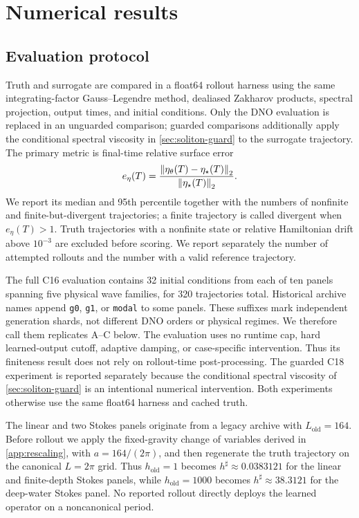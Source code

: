 \section{Numerical results}
\label{sec:results}

\subsection{Evaluation protocol}

Truth and surrogate are compared in a float64 rollout harness using the same
integrating-factor Gauss--Legendre method, dealiased Zakharov products, spectral
projection, output times, and initial conditions. Only the DNO evaluation is
replaced in an unguarded comparison; guarded comparisons additionally apply
the conditional spectral viscosity in \cref{sec:soliton-guard} to the
surrogate trajectory. The primary metric is final-time relative surface error
\begin{equation}
  e_\eta(T)=
  \frac{\left\lVert \eta_\theta(T)-\eta_\star(T)\right\rVert_2}
       {\left\lVert \eta_\star(T)\right\rVert_2}.
  \label{eq:rollout-metric}
\end{equation}
We report its median and 95th percentile together with the numbers of
nonfinite and finite-but-divergent trajectories; a finite trajectory is called
divergent when $e_\eta(T)>1$. Truth trajectories with a nonfinite state or
relative Hamiltonian drift above $10^{-3}$ are excluded before scoring.  We
report separately the number of attempted rollouts and the number with a
valid reference trajectory.

The full C16 evaluation contains 32 initial conditions from each of ten panels
spanning five physical wave families, for 320 trajectories total.  Historical
archive names append \texttt{g0}, \texttt{g1}, or \texttt{modal} to some
panels.  These suffixes mark independent generation shards, not different DNO
orders or physical regimes.  We therefore call them replicates A--C below.  The
evaluation uses no runtime cap, hard
learned-output cutoff, adaptive damping, or case-specific intervention.
Thus its finiteness result does not rely on rollout-time post-processing. The guarded C18
experiment is reported separately because the conditional spectral viscosity
of \cref{sec:soliton-guard} is an intentional numerical intervention. Both
experiments otherwise use the same float64 harness and cached truth.

The linear and two Stokes panels originate from a legacy archive with
$L_{\mathrm{old}}=164$.  Before rollout we apply the fixed-gravity change of
variables derived in \cref{app:rescaling}, with $a=164/(2\pi)$, and then
regenerate the truth trajectory on the canonical $L=2\pi$ grid.  Thus
$h_{\mathrm{old}}=1$ becomes
$h^\sharp\approx0.0383121$ for the linear and finite-depth Stokes panels, while
$h_{\mathrm{old}}=1000$ becomes $h^\sharp\approx38.3121$ for the deep-water
Stokes panel.  No reported rollout directly deploys the learned operator on a
noncanonical period.

